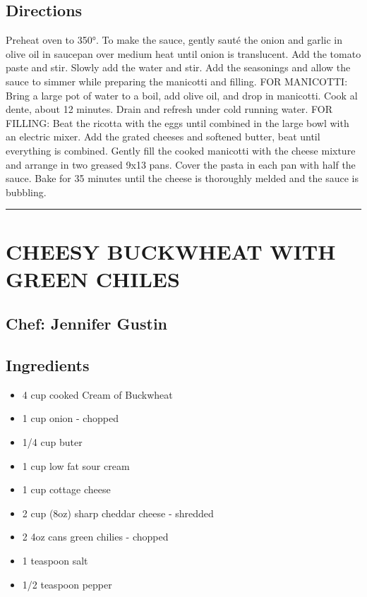 \documentclass[
]{book}
\providecommand{\tightlist}{%
  \setlength{\itemsep}{0pt}\setlength{\parskip}{0pt}}
\begin{document}
\hypertarget{directions-46}{%
\subsection*{Directions}\label{directions-46}}


Preheat oven to 350°. To make the sauce, gently sauté the onion and garlic in olive oil
in saucepan over medium heat until onion is translucent. Add the tomato paste and stir.
Slowly add the water and stir. Add the seasonings and allow the sauce to simmer while preparing
the manicotti and filling. FOR MANICOTTI: Bring a large pot of water to a boil, add olive oil,
and drop in manicotti. Cook al dente, about 12 minutes. Drain and refresh under cold running water.
FOR FILLING: Beat the ricotta with the eggs until combined in the large bowl with an electric mixer.
Add the grated cheeses and softened butter, beat until everything is combined. Gently fill the
cooked manicotti with the cheese mixture and arrange in two greased 9x13 pans. Cover the pasta
in each pan with half the sauce. Bake for 35 minutes until the cheese is thoroughly melded and the sauce is bubbling.

\begin{center}\rule{0.5\linewidth}{0.5pt}\end{center}

\hypertarget{cheesy-buckwheat-with-green-chiles}{%
\section*{CHEESY BUCKWHEAT WITH GREEN CHILES}\label{cheesy-buckwheat-with-green-chiles}}


\hypertarget{chef-jennifer-gustin-7}{%
\subsection*{Chef: Jennifer Gustin}\label{chef-jennifer-gustin-7}}


\hypertarget{ingredients-47}{%
\subsection*{Ingredients}\label{ingredients-47}}


\begin{itemize}
\tightlist
\item
  4 cup cooked Cream of Buckwheat
\item
  1 cup onion - chopped
\item
  1/4 cup buter
\item
  1 cup low fat sour cream
\item
  1 cup cottage cheese
\item
  2 cup (8oz) sharp cheddar cheese - shredded
\item
  2 4oz cans green chilies - chopped
\item
  1 teaspoon salt
\item
  1/2 teaspoon pepper
\end{itemize}
\end{document}
